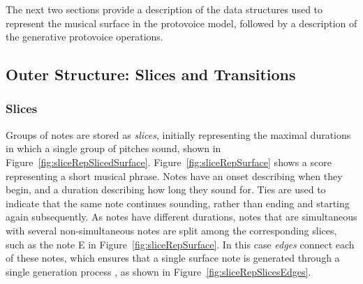 \documentclass[12pt,a4paper,twoside,openany]{report} \usepackage[pdfborder={0 0 0}]{hyperref}    %
\theoremstyle{definition} \newtheorem{definition}{Definition}[section]
\begin{document}
The next two sections provide a description of the data structures used to represent the musical surface in the protovoice model, followed by a description of the generative protovoice operations. 

\subsection{Outer Structure: Slices and Transitions} 
\label{sub:slicesTransitions}

\subsubsection{Slices}
\label{sub:slicesPV}

Groups of notes are stored as \textit{slices}, initially representing the maximal durations in which a single group of pitches sound, shown in Figure~\ref{fig:sliceRepSlicedSurface}.
Figure~\ref{fig:sliceRepSurface} shows a score representing a short musical phrase. 
Notes have an onset describing when they begin, and a duration describing how long they sound for. 
Ties are used to indicate that the same note continues sounding, rather than ending and starting again subsequently. 
As notes have different durations, notes that are simultaneous with several non-simultaneous notes are split among the corresponding slices, such as the note E in Figure~\ref{fig:sliceRepSurface}.
In this case \textit{edges} connect each of these notes, which ensures that a single surface note is generated through a single generation process \cite{finkensiepModelingInferringProtovoice2021}, as shown in Figure~\ref{fig:sliceRepSlicesEdges}. 

\end{document}
